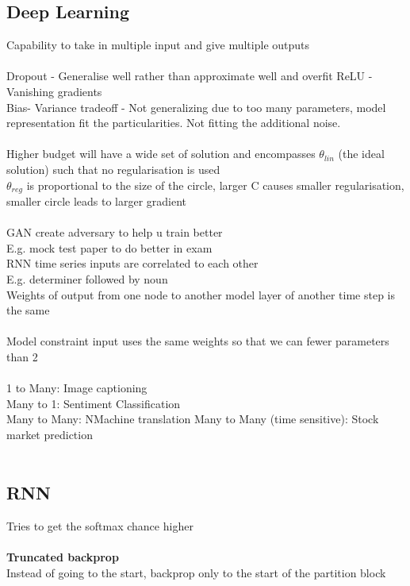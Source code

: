\documentclass[11pt]{article}
\begin{document}
\subsection*{Deep Learning}
Capability to take in multiple input and give multiple outputs\\\\
Dropout - Generalise well rather than approximate well and overfit
ReLU - Vanishing gradients
\\
Bias- Variance tradeoff - Not generalizing due to too many parameters, model representation fit the particularities. Not fitting the additional noise.
\\
\\
Higher budget will have a wide set of solution and encompasses $\theta_{lin}$ (the ideal solution) such that no regularisation is used
\\
$\theta_{reg}$ is proportional to the size of the circle, larger C causes smaller regularisation, smaller circle leads to larger gradient
\\\\
GAN create adversary to help u train better\\
E.g. mock test paper to do better in exam
\\
RNN time series inputs are correlated to each other\\
E.g. determiner followed by noun
\\
Weights of output from one node to another model layer of another time step is the same \\
\\
Model constraint input uses the same weights so that we can fewer parameters than 2
\\
\\
1 to Many: Image captioning\\
Many to 1: Sentiment Classification\\
Many to Many: NMachine translation
Many to Many (time sensitive): Stock market prediction\\
\\
\subsection*{RNN}
Tries to get the softmax chance higher\\\\
\textbf{Truncated backprop}\\
Instead of going to the start, backprop only to the start of the partition block
\end{document}
